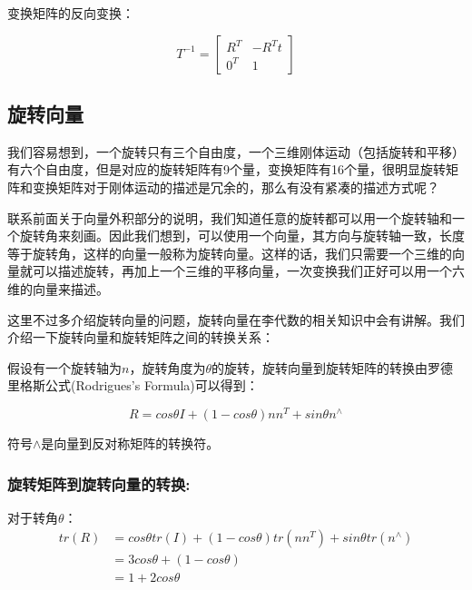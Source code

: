 \documentclass[9pt, oneside]{book}
\begin{document}
变换矩阵的反向变换：

\begin{equation}
    T^{-1} =
    \begin{bmatrix}
        R^T & -R^Tt\\
        0^T & 1
    \end{bmatrix}
\end{equation}

\subsection{旋转向量}

我们容易想到，一个旋转只有三个自由度，一个三维刚体运动（包括旋转和平移）有六个自由度，但是对应的旋转矩阵有9个量，变换矩阵有16个量，很明显旋转矩阵和变换矩阵对于刚体运动的描述是冗余的，那么有没有紧凑的描述方式呢？

联系前面关于向量外积部分的说明，我们知道任意的旋转都可以用一个旋转轴和一个旋转角来刻画。因此我们想到，可以使用一个向量，其方向与旋转轴一致，长度等于旋转角，这样的向量一般称为旋转向量。这样的话，我们只需要一个三维的向量就可以描述旋转，再加上一个三维的平移向量，一次变换我们正好可以用一个六维的向量来描述。

这里不过多介绍旋转向量的问题，旋转向量在李代数的相关知识中会有讲解。我们介绍一下旋转向量和旋转矩阵之间的转换关系：

假设有一个旋转轴为$n$，旋转角度为$\theta$的旋转，旋转向量到旋转矩阵的转换由罗德里格斯公式(Rodrigues's Formula)可以得到：

\begin{equation}
    R = cos\theta I + (1-cos\theta)nn^T + sin\theta n^{\wedge}
\end{equation}

符号$\wedge$是向量到反对称矩阵的转换符。

\subsubsection{旋转矩阵到旋转向量的转换:}

对于转角$\theta$：
\begin{equation}
    \begin{aligned} %
        tr(R) &= cos\theta tr(I) + (1-cos\theta)tr(nn^T) + sin\theta tr(n^\wedge)\\
            &= 3cos\theta + (1-cos\theta)\\
            &= 1 + 2cos\theta
    \end{aligned}
\end{equation}
\end{document}

